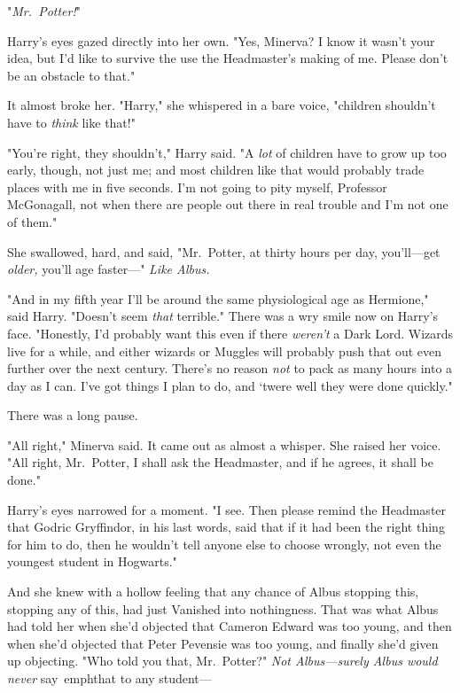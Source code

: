"\emph{Mr.~Potter!}"

Harry's eyes gazed directly into her own. "Yes, Minerva? I know it wasn't your 
idea, but I'd like to survive the use the Headmaster's making of me. Please 
don't be an obstacle to that."

It almost broke her. "Harry," she whispered in a bare voice, "children 
shouldn't have to \emph{think} like that!"

"You're right, they shouldn't," Harry said. "A \emph{lot} of children have to 
grow up too early, though, not just me; and most children like that would 
probably trade places with me in five seconds. I'm not going to pity myself, 
Professor McGonagall, not when there are people out there in real trouble and 
I'm not one of them."

She swallowed, hard, and said, "Mr.~Potter, at thirty hours per day, 
you'll---get \emph{older,} you'll age faster---" \emph{Like Albus.}

"And in my fifth year I'll be around the same physiological age as Hermione," 
said Harry. "Doesn't seem \emph{that} terrible." There was a wry smile now on 
Harry's face. "Honestly, I'd probably want this even if there \emph{weren't} a 
Dark Lord. Wizards live for a while, and either wizards or Muggles will 
probably push that out even further over the next century. There's no reason 
\emph{not} to pack as many hours into a day as I can. I've got things I plan to 
do, and `twere well they were done quickly."

There was a long pause.

"All right," Minerva said. It came out as almost a whisper. She raised her 
voice. "All right, Mr.~Potter, I shall ask the Headmaster, and if he agrees, it 
shall be done."

Harry's eyes narrowed for a moment. "I see. Then please remind the Headmaster 
that Godric Gryffindor, in his last words, said that if it had been the right 
thing for him to do, then he wouldn't tell anyone else to choose wrongly, not 
even the youngest student in Hogwarts."

And she knew with a hollow feeling that any chance of Albus stopping this, 
stopping any of this, had just Vanished into nothingness. That was what Albus 
had told her when she'd objected that Cameron Edward was too young, and then 
when she'd objected that Peter Pevensie was too young, and finally she'd given 
up objecting. "Who told you that, Mr.~Potter?" \emph{Not Albus---surely Albus 
would never} say\ emph{that to any student---}


